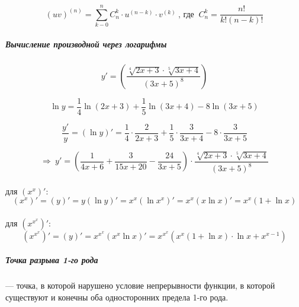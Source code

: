 \documentclass[12pt, a4]{article}
\begin{document}
\[ (uv)^{(n)} = \sum_{k-0}^{n} C_{n}^{k} \cdot u^{(n-k)} \cdot v^{(k)} \ \textrm{, где } \ C_{n}^{k} = \frac{n!}{k! (n-k)!} \]

\subparagraph{Вычисление производной через логарифмы}
\[ y'=(\frac{\sqrt[4]{2x+3}\cdot\sqrt[5]{3x+4}}{(3x+5)^8}) \]
\begin{center}
\end{center}
\[ \ln y = \frac{1}{4}\ln(2x+3) + \frac{1}{5}\ln(3x+4) - 8\ln(3x+5) \]
\begin{center}
\end{center}
\[ \frac{y'}{y} = (\ln y)' = \frac{1}{4}\cdot\frac{2}{2x+3} + \frac{1}{5}\cdot\frac{3}{3x+4} - 8\cdot\frac{3}{3x+5} \]

\[\Rightarrow \ y' = (\frac{1}{4x+6} + \frac{3}{15x+20} - \frac{24}{3x+5}) \cdot \frac{\sqrt[4]{2x+3}\cdot\sqrt[5]{3x+4}}{(3x+5)^8} \]
\\
для $(x^x)'$:
\[ (x^x)' = (y)' = y(\ln y)' = x^x(\ln x^x)' = x^x(x\ln x)' = x^x(1+\ln x) \]
\\
для $(x^{x^x})'$:
\[ (x^{x^x})' = (y)' = x^{x^x}(x^{x}\ln x)' = x^{x^x}(x^x(1+\ln x)\cdot \ln x + x^{x-1}) \]

\subparagraph{Точка разрыва 1-го рода} --- точка, в которой нарушено условие непрерывности функции, в которой существуют и конечны оба односторонних предела 1-го рода.
\end{document}
